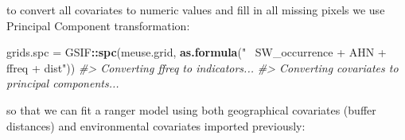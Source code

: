 \documentclass[graybox,natbib,nospthms,UStrade]{svmono}
\newenvironment{Shaded}{\begin{snugshade}}{\end{snugshade}}
\newcommand{\CommentTok}[1]{\textcolor[rgb]{0.37,0.37,0.37}{\textit{#1}}}
\newcommand{\KeywordTok}[1]{\textcolor[rgb]{0.27,0.27,0.27}{\textbf{#1}}}
\newcommand{\NormalTok}[1]{#1}
\newcommand{\OperatorTok}[1]{\textcolor[rgb]{0.43,0.43,0.43}{\textbf{#1}}}
\newcommand{\StringTok}[1]{\textcolor[rgb]{0.5,0.5,0.5}{#1}}
\begin{document}
to convert all covariates to numeric values and fill in all missing pixels we use Principal Component transformation:

\begin{Shaded}
\begin{Highlighting}[]
\NormalTok{grids.spc =}\StringTok{ }\NormalTok{GSIF}\OperatorTok{::}\KeywordTok{spc}\NormalTok{(meuse.grid, }\KeywordTok{as.formula}\NormalTok{(}\StringTok{"~ SW_occurrence + AHN + ffreq + dist"}\NormalTok{))}
\CommentTok{#> Converting ffreq to indicators...}
\CommentTok{#> Converting covariates to principal components...}
\end{Highlighting}
\end{Shaded}

so that we can fit a ranger model using both geographical covariates (buffer distances) and environmental covariates imported previously:
\end{document}
